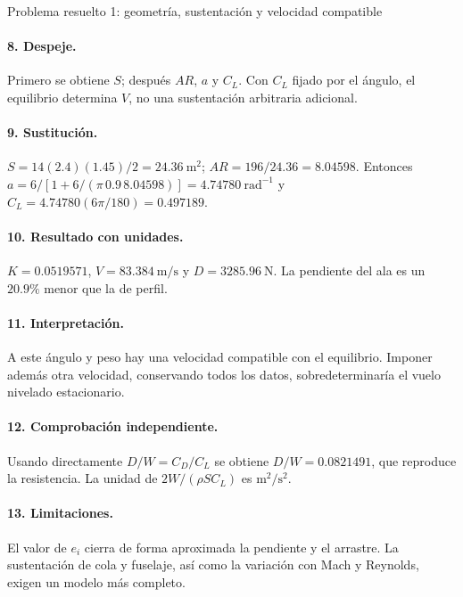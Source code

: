 \begin{studiumworked}{Problema resuelto 1: geometría, sustentación y velocidad compatible}
\paragraph{8. Despeje.} Primero se obtiene $S$; después $AR$, $a$ y $C_L$. Con $C_L$ fijado por el ángulo, el equilibrio determina $V$, no una sustentación arbitraria adicional.
\paragraph{9. Sustitución.} $S=14(2.4)(1.45)/2=24.36\ \mathrm{m^2}$; $AR=196/24.36=8.04598$. Entonces $a=6/[1+6/(\pi\,0.9\,8.04598)]=4.74780\ \mathrm{rad^{-1}}$ y $C_L=4.74780(6\pi/180)=0.497189$.
\paragraph{10. Resultado con unidades.} $K=0.0519571$, $V=83.384\ \mathrm{m/s}$ y $D=3285.96\ \mathrm N$. La pendiente del ala es un $20.9\%$ menor que la de perfil.
\paragraph{11. Interpretación.} A este ángulo y peso hay una velocidad compatible con el equilibrio. Imponer además otra velocidad, conservando todos los datos, sobredeterminaría el vuelo nivelado estacionario.
\paragraph{12. Comprobación independiente.} Usando directamente $D/W=C_D/C_L$ se obtiene $D/W=0.0821491$, que reproduce la resistencia. La unidad de $2W/(\rho SC_L)$ es $\mathrm{m^2/s^2}$.
\paragraph{13. Limitaciones.} El valor de $e_i$ cierra de forma aproximada la pendiente y el arrastre. La sustentación de cola y fuselaje, así como la variación con Mach y Reynolds, exigen un modelo más completo.


\end{studiumworked}

